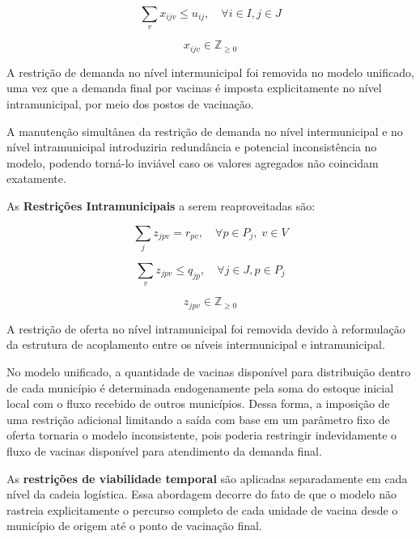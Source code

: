 \begin{equation*}
\sum_{v} x_{ijv} \le u_{ij}, \quad \forall i \in I, j \in J
\end{equation*}

\begin{equation*}
x_{ijv} \in \mathbb{Z}_{\geq 0}
\end{equation*}

A restrição de demanda no nível intermunicipal foi removida no modelo unificado, uma vez que a demanda final por vacinas é imposta explicitamente no nível intramunicipal, por meio dos postos de vacinação.

A manutenção simultânea da restrição de demanda no nível intermunicipal e no nível intramunicipal introduziria redundância e potencial inconsistência no modelo, podendo torná-lo inviável caso os valores agregados não coincidam exatamente.

As \textbf{Restrições Intramunicipais} a serem reaproveitadas são:

\begin{equation*}
\sum_{j} z_{jpv} = r_{pv}, \quad \forall p \in P_j, \; v \in V
\end{equation*}

\begin{equation*}
\sum_{v} z_{jpv} \le q_{jp}, \quad \forall j \in J, p \in P_j
\end{equation*}

\begin{equation*}
z_{jpv} \in \mathbb{Z}_{\geq 0}
\end{equation*}

A restrição de oferta no nível intramunicipal foi removida devido à reformulação da estrutura de acoplamento entre os níveis intermunicipal e intramunicipal.

No modelo unificado, a quantidade de vacinas disponível para distribuição dentro de cada município é determinada endogenamente pela soma do estoque inicial local com o fluxo recebido de outros municípios. Dessa forma, a imposição de uma restrição adicional limitando a saída com base em um parâmetro fixo de oferta tornaria o modelo inconsistente, pois poderia restringir indevidamente o fluxo de vacinas disponível para atendimento da demanda final.

As \textbf{restrições de viabilidade temporal} são aplicadas separadamente em cada nível da cadeia logística. Essa abordagem decorre do fato de que o modelo não rastreia explicitamente o percurso completo de cada unidade de vacina desde o município de origem até o ponto de vacinação final.

